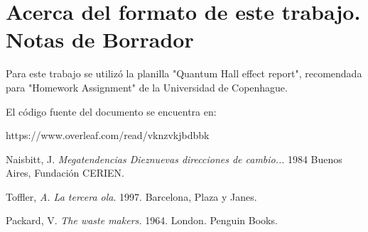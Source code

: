 \documentclass[a4paper, 12pt]{article}
\begin{document}
\section{Acerca del formato de este trabajo. Notas de Borrador}
Para este trabajo se utilizó la planilla "Quantum Hall effect report", recomendada para "Homework Assignment" de la Universidad de Copenhague.

El código fuente del documento se encuentra en:

https://www.overleaf.com/read/vknzvkjbdbbk

\begin{thebibliography}{9}

Naisbitt, J. \emph{Megatendencias Dieznuevas direcciones de cambio..}. 1984 Buenos Aires, Fundación CERIEN.

Toffler, \emph{A. La tercera ola}. 1997. Barcelona, Plaza y Janes. 


Packard, V. \emph{The waste makers.} 1964. London. Penguin Books.

\end{thebibliography}
\end{document}
